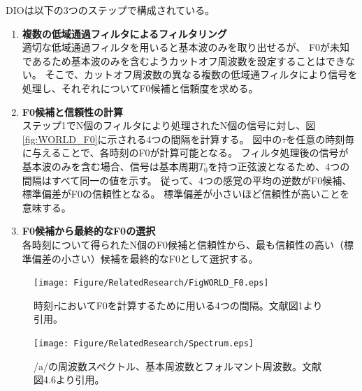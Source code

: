 DIOは以下の3つのステップで構成されている。
\begin{enumerate}
    \item \textbf{複数の低域通過フィルタによるフィルタリング}\mbox{}\\
            適切な低域通過フィルタを用いると基本波のみを取り出せるが、
            F0が未知であるため基本波のみを含むようカットオフ周波数を設定することはできない。
            そこで、カットオフ周波数の異なる複数の低域通フィルタにより信号を処理し、それぞれについてF0候補と信頼度を求める。
    \item \textbf{F0候補と信頼性の計算}\mbox{}\\
            ステップ1でN個のフィルタにより処理されたN個の信号に対し、図\ref{fig:WORLD_F0}に示される4つの間隔を計算する。
            図中の$\tau$を任意の時刻毎に与えることで、各時刻のF0が計算可能となる。
            フィルタ処理後の信号が基本波のみを含む場合、信号は基本周期$T_0$を持つ正弦波となるため、4つの間隔はすべて同一の値を示す。
            従って、4つの感覚の平均の逆数がF0候補、標準偏差がF0の信頼性となる。
            標準偏差が小さいほど信頼性が高いことを意味する。
    \item \textbf{F0候補から最終的なF0の選択}\mbox{}\\
            各時刻について得られたN個のF0候補と信頼性から、最も信頼性の高い（標準偏差の小さい）候補を最終的なF0として選択する。

\end{enumerate}


\begin{figure}[h]
    \begin{minipage}[b]{0.5\hsize}
        \vspace{50pt}
        \centering
        \texttt{[image: Figure/RelatedResearch/FigWORLD\_F0.eps]}
        \caption{時刻$\tau$においてF0を計算するために用いる4つの間隔。文献\cite{morise2016Kihonha}図1より引用。}
        \label{fig:WORLD_F0}
    \end{minipage}
    \hspace{0.05\hsize}
    \begin{minipage}[b]{0.5\hsize}
        \vspace{50pt}
        \centering
        \texttt{[image: Figure/RelatedResearch/Spectrum.eps]}
        \caption{/a/の周波数スペクトル、基本周波数とフォルマント周波数。文献\cite{Suzuki2011nyuumon}図4.6より引用。}
        \label{fig:Spectrum}
    \end{minipage}
    
\end{figure}



